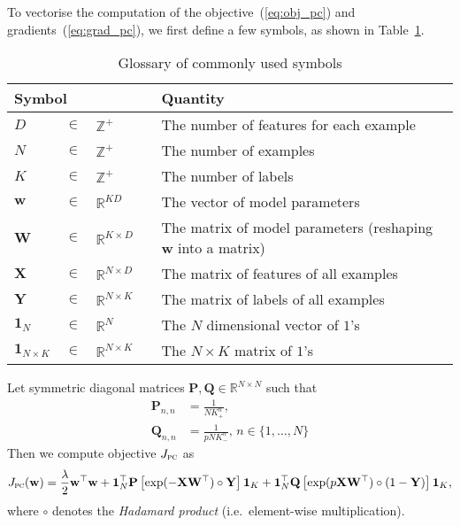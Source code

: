 \documentclass[9pt]{extarticle}
\newcommand{\1}{\mathbf{1}}
\newcommand{\w}{\mathbf{w}}
\newcommand{\Pb}{\mathbf{P}}
\newcommand{\Q}{\mathbf{Q}}
\newcommand{\W}{\mathbf{W}}
\newcommand{\X}{\mathbf{X}}
\newcommand{\Y}{\mathbf{Y}}
\newcommand{\R}{\mathbb{R}}
\newcommand{\Z}{\mathbb{Z}}
\newcommand{\one}{\mathbf{1}}
\newcommand{\ie}{i.e.\ }
\begin{document}
To vectorise the computation of the objective~(\ref{eq:obj_pc}) and gradients~(\ref{eq:grad_pc}), 
we first define a few symbols, as shown in Table~\ref{tab:symbols}.
\begin{table}[!h]
\caption{Glossary of commonly used symbols}
\label{tab:symbols}
\renewcommand{\arraystretch}{1.5} %
\setlength{\tabcolsep}{1pt} %
\centering
\begin{tabular}{llll}
\toprule
\multicolumn{3}{l}{\textbf{Symbol}} & \textbf{Quantity} \\ \hline 
$D$        &  $\in$  &  $\Z^+$            & The number of features for each example \\
$N$        &  $\in$  &  $\Z^+$            & The number of examples \\
$K$        &  $\in$  &  $\Z^+$            & The number of labels \\
$\w$       &  $\in$  &  $\R^{K D}$        & The vector of model parameters \\
$\W$       &  $\in$  &  $\R^{K \times D}$ & The matrix of model parameters (reshaping $\w$ into a matrix) \\
$\X$       &  $\in$  &  $\R^{N \times D}$ & The matrix of features of all examples \\
$\Y$       &  $\in$  &  $\R^{N \times K}$ & The matrix of labels of all examples \\
$\one_N$   &  $\in$  &  $\R^N$            & The $N$ dimensional vector of $1$'s \\
$\one_{N \times K}$  &  $\in$  &  $\R^{N \times K} \quad$  & The $N \times K$ matrix of $1$'s \\
\bottomrule
\end{tabular}
\end{table}

Let symmetric diagonal matrices $\Pb, \Q \in \R^{N \times N}$ such that
\begin{align*}
\Pb_{n,n} &= \frac{1}{N K_+^n}, \\
\Q_{n,n}  &= \frac{1}{p N K_-^n}, \, n \in \{1,\dots,N\}
\end{align*}
Then we compute objective $J_\textsc{pc}$ as
$$
J_\textsc{pc}(\w) 
= \frac{\lambda}{2} \w^\top \w + 
  \one_N^\top \Pb \left[ \exp(- \X \W^\top) \circ \Y     \right] \one_K +
  \one_N^\top \Q  \left[ \exp(p \X \W^\top) \circ (1-\Y) \right] \one_K,
$$
where $\circ$ denotes the \emph{Hadamard product} (\ie element-wise multiplication).
\end{document}
